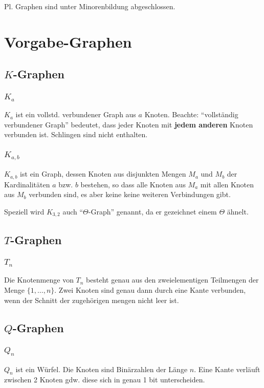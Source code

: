 \documentclass[a4paper,11pt]{report}
\begin{document}
Pl. Graphen sind unter Minorenbildung abgeschlossen.


\chapter{Vorgabe-Graphen}
\section{$K$-Graphen}
\subsection{$K_a$}
$K_a$ ist ein vollstd. verbundener Graph aus $a$ Knoten. Beachte: ``vollständig verbundener Graph'' bedeutet, dass jeder Knoten mit {\bf jedem anderen} Knoten verbunden ist. Schlingen sind nicht enthalten.


\subsection{$K_{a, b}$}
$K_{a, b}$ ist ein Graph, dessen Knoten aus disjunkten Mengen $M_a$ und $M_b$ der Kardinalitäten $a$ bzw. $b$ bestehen, so dass alle Knoten aus $M_a$ mit allen Knoten aus $M_b$ verbunden sind, es aber keine keine weiteren Verbindungen gibt.

Speziell wird $K_{3, 2}$ auch ``$\Theta$-Graph'' genannt, da er gezeichnet einem $\Theta$ ähnelt.


\section{$T$-Graphen}
\subsection{$T_n$}
Die Knotenmenge von $T_n$ besteht genau aus den zweielementigen Teilmengen der Menge $\{1, \ldots, n\}$. Zwei Knoten sind genau dann durch eine Kante verbunden, wenn der Schnitt der zugehörigen mengen nicht leer ist.


\section{$Q$-Graphen}
\subsection{$Q_n$}
$Q_n$ ist ein Würfel. Die Knoten sind Binärzahlen der Länge $n$. Eine Kante verläuft zwischen 2 Knoten gdw. diese sich in genau 1 bit unterscheiden.
\end{document}

